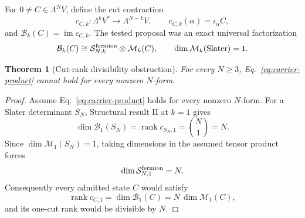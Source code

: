 \documentclass[aps,pra,reprint,superscriptaddress,nofootinbib,longbibliography,showkeys]{revtex4-2}
\newtheorem{theorem}{Theorem}[section]
\theoremstyle{definition}
\newcommand{\rank}{\operatorname{rank}}
\newcommand{\im}{\operatorname{im}}
\begin{document}
For $0\ne C\in\Lambda^N V$, define the cut contraction
\[
 c_{C,k}:\Lambda^kV^*\longrightarrow\Lambda^{N-k}V,
 \qquad c_{C,k}(\alpha)=\iota_\alpha C,
\]
and $\mathcal B_k(C)=\im c_{C,k}$.  The tested proposal was an exact universal
factorization
\begin{equation}
 \mathcal B_k(C)\cong
 \mathcal S^{\rm fermion}_{N,k}\otimes\mathcal M_k(C),
 \qquad \dim\mathcal M_k(\text{Slater})=1.
 \label{eq:carrier-product}
\end{equation}

\begin{theorem}[Cut-rank divisibility obstruction]
For every $N\ge3$, Eq.~\eqref{eq:carrier-product} cannot hold for every
nonzero $N$-form.
\end{theorem}

\begin{proof}
Assume Eq.~\eqref{eq:carrier-product} holds for every nonzero $N$-form.  For a
Slater determinant $S_N$, Structural result II at $k=1$ gives
\begin{equation}
\dim\mathcal B_1(S_N)=\rank c_{S_N,1}=\binom N1=N.
\end{equation}
Since $\dim\mathcal M_1(S_N)=1$, taking dimensions in the assumed tensor
product forces
\begin{equation}
\dim\mathcal S^{\rm fermion}_{N,1}=N.
\label{eq:audit-carrier-dim}
\end{equation}
Consequently every admitted state $C$ would satisfy
\begin{equation}
\rank c_{C,1}=\dim\mathcal B_1(C)
=N\,\dim\mathcal M_1(C),
\label{eq:audit-carrier-div}
\end{equation}
and its one-cut rank would be divisible by $N$.


\end{proof}
\end{document}
